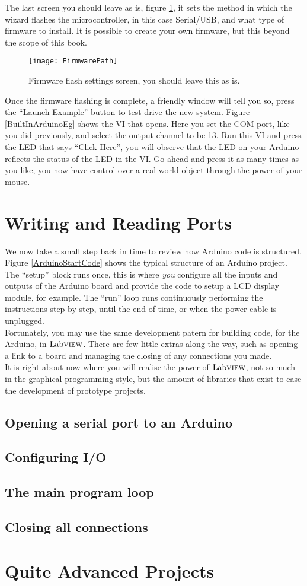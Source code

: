 The last screen you should leave as is, figure \ref{FirmwareConf}, it sets the method in which the wizard flashes the microcontroller, in this case Serial/USB, and what type of firmware to install. It is possible to create your own firmware, but this beyond the scope of this book.\\
\begin{figure}
	\centering
	\texttt{[image: FirmwarePath]}
	\caption{Firmware flash settings screen, you should leave this as is.}
	\label{FirmwareConf}
\end{figure}

Once the firmware flashing is complete, a friendly window will tell you so, press the ``Launch Example'' button to test drive the new system. Figure \ref{BuiltInArduinoEg} shows the VI that opens. %
 Here you set the COM port, like you did previously, and select the output channel to be 13. Run this VI and press the LED that says ``Click Here'', you will observe that the LED on your Arduino reflects the status of the LED in the VI. Go ahead and press it as many times as you like, you now have control over a real world object through the power of your mouse.
 
\section{Writing and Reading Ports}
We now take a small step back in time to review how Arduino code is structured. Figure \ref{ArduinoStartCode} shows the typical structure of an Arduino project. The ``setup'' block runs once, this is where \textit{you} configure all the inputs and outputs of the Arduino board and provide the code to setup a LCD display module, for example. The ``run'' loop runs continuously %
performing the instructions step-by-step, until the end of time, or when the power cable is unplugged.\\

Fortunately, you may use the same development patern for building code, for the Arduino, in $\text{Lab}\textsc{view}$. There are few little extras along the way, such as opening a link to a board and managing the closing of any connections you made.\\

It is right about now where you will realise the power of $\text{Lab}\textsc{view}$, not so much in the graphical programming style, but the amount of libraries that exist to ease the development of prototype projects.\\

\subsection{Opening a serial port to an Arduino}
\subsection{Configuring I/O}
\subsection{The main program loop} 
\subsection{Closing all connections}
\section{Quite Advanced Projects}